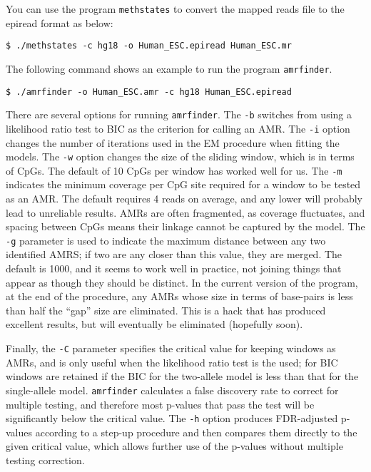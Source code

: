 \documentclass[10pt]{article}
\newcommand{\prog}[1]{\texttt{#1}}
\newcommand{\op}[1]{\texttt{#1}}
\begin{document}
You can use the program \prog{methstates} to convert the mapped reads
file to the epiread format as below:

\begin{verbatim}
$ ./methstates -c hg18 -o Human_ESC.epiread Human_ESC.mr 
\end{verbatim}

The following command shows an example to run the program
\prog{amrfinder}.
\begin{verbatim}
$ ./amrfinder -o Human_ESC.amr -c hg18 Human_ESC.epiread
\end{verbatim}

There are several options for running \prog{amrfinder}. The \op{-b}
switches from using a likelihood ratio test to BIC as the criterion
for calling an AMR. The \op{-i} option changes the number of
iterations used in the EM procedure when fitting the models.
The \op{-w} option changes the size of the sliding
window, which is in terms of CpGs. The default of 10 CpGs per window
has worked well for us. The \op{-m} indicates the minimum coverage per
CpG site required for a window to be tested as an AMR. The default
requires 4 reads on average, and any lower will probably lead to
unreliable results. AMRs are often fragmented, as coverage fluctuates,
and spacing between CpGs means their linkage cannot be captured by the
model. The \op{-g} parameter is used to indicate the maximum distance
between any two identified AMRS; if two are any closer than this
value, they are merged. The default is 1000, and it seems to work well
in practice, not joining things that appear as though they should be
distinct. In the current version of the program, at the end of the
procedure, any AMRs whose size in terms of base-pairs is less than
half the ``gap'' size are eliminated. This is a hack that has produced
excellent results, but will eventually be eliminated (hopefully
soon).

Finally, the \op{-C} parameter specifies the critical value for
keeping windows as AMRs, and is only useful when the likelihood ratio
test is the used; for BIC windows are retained if the BIC for the
two-allele model is less than that for the single-allele model.
\prog{amrfinder} calculates a false discovery rate to correct for
multiple testing, and therefore most p-values that pass the test
will be significantly below the critical value. The \op{-h} option
produces FDR-adjusted p-values according to a step-up procedure
and then compares them directly to the given critical value, which 
allows further use of the p-values without multiple testing correction.
\end{document}
